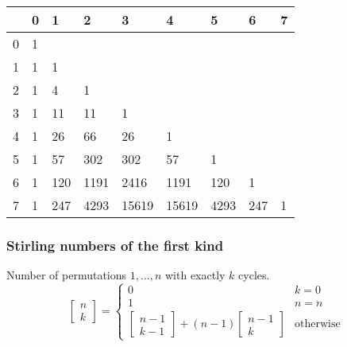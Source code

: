 \begin{center}
	\begin{tabular}{ |l||l|l|l|l|l|l|l|l| } 
		\hline
		\diagbox{$n$}{$k$} & 0 & 1 & 2 & 3 & 4 & 5 & 6 & 7  \\
		\hline\hline
		0 &  1 &     &      &       &        &       &      &    \\
		1 &  1 & 1   &      &       &        &       &      &    \\
		2 &  1 & 4   & 1    &       &        &       &      &    \\
		3 &  1 & 11  & 11   & 1     &        &       &      &    \\
		4 &  1 & 26  & 66   & 26    & 1      &       &      &    \\
		5 &  1 & 57  & 302  & 302   & 57     & 1     &      &    \\
		6 &  1 & 120 & 1191 & 2416  & 1191   & 120   & 1    &    \\
		7 &  1 & 247 & 4293 & 15619 & 15619  & 4293  & 247  & 1  \\
		\hline
	\end{tabular}
\end{center}

\subsubsection{Stirling numbers of the first kind}
Number of permutations $1, \dots, n$ with exactly $k$ cycles.
\begin{equation*}
  \begin{bmatrix}
    n\\k
  \end{bmatrix} =
  \begin{cases}
    0 & k = 0\\
    1 & n = n\\
    \left[
      \begin{smallmatrix}
        n - 1\\k - 1
      \end{smallmatrix}
\right] + (n - 1) \left[
  \begin{smallmatrix}
    n-1\\k
  \end{smallmatrix}
\right] & \text{otherwise}
  \end{cases}
\end{equation*}

